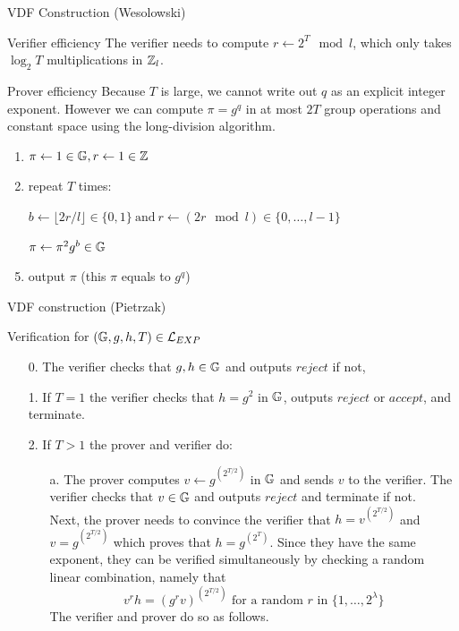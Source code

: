 \documentclass[UTF8]{beamer}
\begin{document}
	\begin{frame}{VDF Construction (Wesolowski)}
		\begin{block}{Verifier efficiency}
			The verifier needs to compute $r\gets 2^T\mod l$, which only takes $\log_2T$ multiplications in $\mathbb{Z}_l$.
		\end{block}
		\begin{block}{Prover efficiency}
			Because $T$ is large, we cannot write out $q$ as an explicit integer exponent. However we can compute $\pi=g^q$ in at most $2T$ group operations and constant space using the long-division algorithm.
			\begin{enumerate}
				\item $\pi\gets1\in\mathbb{G}, r\gets1\in\mathbb{Z}$
				\item repeat $T$ times:
				\item [] $b\gets\lfloor2r/l\rfloor\in\{0,1\}~\text{and}~r\gets(2r\mod l)\in\{0,\dots,l-1\}$
				\item [] $\pi\gets\pi^2g^b\in\mathbb{G}$
				\item output $\pi$ (this $\pi$ equals to $g^q$)
			\end{enumerate}
		\end{block}
	\end{frame}

	\begin{frame}{VDF construction (Pietrzak)}
		\begin{block}{Verification for $(\mathbb{G},g,h,T)\in\mathcal{L}_{EXP}$}
			\begin{enumerate}
				\item [0.] The verifier checks that $g,h\in\mathbb{G}$ and outputs $reject$ if not,
				\item [1.] If $T=1$ the verifier checks that $h=g^2$ in $\mathbb{G}$, outputs $reject$ or $accept$, and terminate.
				\item [2.] If $T>1$ the prover and verifier do:
				\begin{enumerate}
					\item [a.] The prover computes $v\gets g^{(2^{T/2})}$ in $\mathbb{G}$ and sends $v$ to the verifier. The verifier checks that $v\in\mathbb{G}$ and outputs $reject$ and terminate if not.\\
					Next, the prover needs to convince the verifier that $h=v^{(2^{T/2})}$ and $v=g^{(2^{T/2})}$ which proves that $h=g^{(2^{T})}$. Since they have the same exponent, they can be verified simultaneously by checking a random linear combination, namely that
					$$v^rh=(g^rv)^{(2^{T/2})}\text{ for a random }r \text{ in } \{1,\dots,2^\lambda\}$$
					The verifier and prover do so as follows.
				\end{enumerate}
			\end{enumerate}
		\end{block}
	\end{frame}
\end{document}
